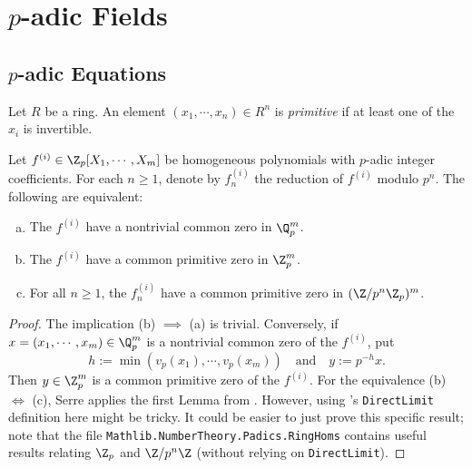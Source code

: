 \chapter[p-adic Fields]{$p$-adic Fields}

\section[p-adic Equations]{$p$-adic Equations}\label{sec:padic_equations}

\begin{definition}\label{def:primitive}
\leanok
Let $R$ be a ring. An element $(x_1, \cdots, x_n) \in R^n$ is \emph{primitive} if at least one of the $x_i$ is invertible.
\end{definition}


\begin{proposition}\label{prop:common_root}
\leanok
{}
Let $f^{(i)} \in \Z_p[X_1, \cdots, X_m]$ be homogeneous polynomials with $p$-adic integer coefficients. For each $n \ge 1$, denote by $f_n^{(i)}$ the reduction of $f^{(i)}$ modulo $p^n$.
 The following are equivalent:
\begin{enumerate}[a)]
\leanok
\item The $f^{(i)}$ have a nontrivial common zero in $\Q_p^m$.
\item The $f^{(i)}$ have a common primitive zero in $\Z_p^m$.
\item For all $n \ge 1$, the $f_n^{(i)}$ have a common primitive zero in $(\Z / p^n \Z_p)^m$.
\end{enumerate}
\end{proposition}

\begin{proof}
The implication (b) $ \implies$ (a) is trivial. Conversely, if $x = (x_1, \cdots, x_m) \in \Q_p^m$ is a nontrivial common zero of the $f^{(i)}$, put
\[ h := \min(v_p(x_1), \cdots, v_p(x_m)) \quad \text{and} \quad y := p^{-h} x. \]
Then $y \in \Z_p^m$ is a common primitive zero of the $f^{(i)}$.
For the equivalence (b) $\iff$ (c), Serre applies the first Lemma from \cite[\S II.2.1]{Ser73}. However, using \mathlib's \texttt{DirectLimit} definition here might be tricky. It could be easier to just prove this specific result; note that the file \texttt{Mathlib.NumberTheory.Padics.RingHoms} contains useful results relating $\Z_p$ and $\Z/p^n\Z$ (without relying on \texttt{DirectLimit}).

\end{proof}

